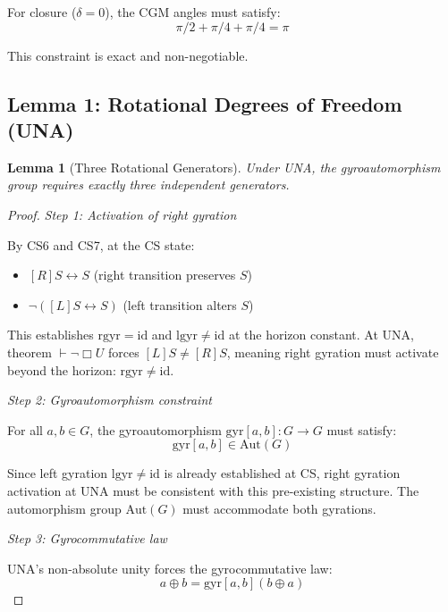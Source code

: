 \documentclass[11pt,a4paper]{article}
\newtheorem{lemma}[theorem]{Lemma}
\theoremstyle{definition}
\theoremstyle{remark}
\begin{document}
For closure ($\delta = 0$), the CGM angles must satisfy:
\begin{equation}
\pi/2 + \pi/4 + \pi/4 = \pi
\end{equation}

This constraint is exact and non-negotiable.

\subsection{Lemma 1: Rotational Degrees of Freedom (UNA)}

\begin{lemma}[Three Rotational Generators]
Under UNA, the gyroautomorphism group requires exactly three independent generators.
\end{lemma}

\begin{proof}
\textit{Step 1: Activation of right gyration}

By CS6 and CS7, at the CS state:
\begin{itemize}
\item $[R]S \leftrightarrow S$ (right transition preserves $S$)
\item $\neg([L]S \leftrightarrow S)$ (left transition alters $S$)
\end{itemize}

This establishes $\mathrm{rgyr} = \mathrm{id}$ and $\mathrm{lgyr} \neq \mathrm{id}$ at the horizon constant. At UNA, theorem $\vdash \neg\Box U$ forces $[L]S \neq [R]S$, meaning right gyration must activate beyond the horizon: $\mathrm{rgyr} \neq \mathrm{id}$.

\textit{Step 2: Gyroautomorphism constraint}

For all $a, b \in G$, the gyroautomorphism $\mathrm{gyr}[a,b]: G \to G$ must satisfy:
\begin{equation}
\mathrm{gyr}[a,b] \in \mathrm{Aut}(G)
\end{equation}

Since left gyration $\mathrm{lgyr} \neq \mathrm{id}$ is already established at CS, right gyration activation at UNA must be consistent with this pre-existing structure. The automorphism group $\mathrm{Aut}(G)$ must accommodate both gyrations.

\textit{Step 3: Gyrocommutative law}

UNA's non-absolute unity forces the gyrocommutative law:
\begin{equation}
a \oplus b = \mathrm{gyr}[a,b](b \oplus a)
\end{equation}


\end{proof}
\end{document}
